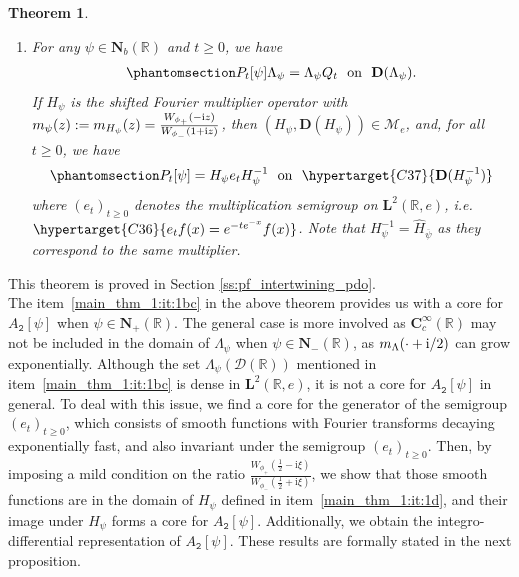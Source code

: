 \documentclass[12pt]{amsart}
\newcommand{\hlabel}{\phantomsection\label}
\newcommand{\hptg}[2]{\hypertarget{#1}{#2}}
\numberwithin{equation}{section}
\newcommand{\bb}{\mathbb}
\renewcommand{\ge}{\geqslant}
\newcommand{\ov}{\overline}
\newcommand{\ttt}{\mathtt}
\newcommand{\bmrm}[2][2]{\mathbf{#2}^{#1}}
\newcommand{\Hpsi}{H_\psi}
\newcommand{\Hpsinv}{H^{-1}_\psi}
\newcommand{\Hpsid}{\widehat{H}_{\ov{\psi}}}
\newcommand{\Wphip}{W_{\phi_+}\left(\frac{1}{2}-\i\xi\right)}
\newcommand{\Wphim}{W_{\phi_-}\left(\frac{1}{2}+\i\xi\right)}
\newcommand{\C}{\mathbf{C}}
\newcommand{\D}{\mathbf{D}}
\renewcommand{\i}{\mathrm{i}}
\newcommand{\LRe}{\bmrm{L}(\bb{R},e)}
\newcommand{\NN}{\mathbf{N}}
\newcommand{\cD}{\mathcal{D}}
\newtheorem{thm}{Theorem}[section]
\theoremstyle{definition}
\theoremstyle{assump}
\theoremstyle{remark}
\begin{document}
{\begin{thm}
\begin{enumerate}[(1)]
\item \hlabel{main_thm_1:it:1d} For any $\psi\in\NN_b(\bb R)$ and  $t\ge 0$, we have
\begin{align}\hlabel{eq:bdd_intertwining}
P_t[\psi]\Lambda_\psi=\Lambda_\psi Q_t \ \mbox{ on } \ \D(\Lambda_\psi).
\end{align}
If $\Hpsi$ is the shifted Fourier multiplier operator with $m_{\psi}(z):=m_{\Hpsi}(z)=\frac{W_{\phi_+}(-{\rm{i}}z)}{W_{\phi_-}(1+{\rm{i}}z)}$, then $(\Hpsi,\D(\Hpsi))\in\mathscr{M}_e$, and, for all $t\ge 0$, we have
\begin{align}\hlabel{eq:spect_decomp}
	P_t[\psi] =\Hpsi e_t\Hpsinv \ \mbox{ on  } \ \hptg{C37}{\D(\Hpsinv)}
\end{align}
where  $(e_t)_{t\ge 0}$ denotes the multiplication semigroup on $\bmrm{L}(\bb{R},e)$, i.e.~ $\hptg{C36}{e_t f(x)=e^{-te^{-x}}f(x)}$. Note that $\Hpsinv=\Hpsid$ as they correspond to the same multiplier.
\end{enumerate}
\end{thm}
This theorem is proved in Section \ref{ss:pf_intertwining_pdo}. \\

\noindent
The item~\eqref{main_thm_1:it:1bc} in the above theorem provides us with a core for $A_\ttt{2}[\psi]$ when $\psi\in\NN_+(\bb R)$. The general case is more involved as $\C^\infty_c(\bb R)$ may not be included in the domain of $\Lambda_\psi$ when $\psi\in\NN_-(\bb R)$, as $m_{\Lambda}(\cdot+{\rm{i}}/2)$ can grow exponentially. Although the set $\Lambda_\psi(\cD(\bb R))$ mentioned in item~\eqref{main_thm_1:it:1bc} is dense in $\LRe$, it is not a core for $A_\ttt{2}[\psi]$ in general. To deal with this issue, we find a core for the generator of the semigroup $(e_t)_{t\ge 0}$, which consists of smooth functions with Fourier transforms decaying exponentially fast, and also invariant under the semigroup $(e_t)_{t\ge 0}$. Then, by imposing a mild condition on the ratio $\frac{\Wphip}{\Wphim}$, we show that those smooth functions are in the domain of $\Hpsi$ defined in item~\eqref{main_thm_1:it:1d}, and their image under $\Hpsi$ forms a core for $A_\ttt{2}[\psi]$. Additionally, we obtain the integro-differential representation of $A_\ttt{2}[\psi]$. These results are formally stated in the next proposition.

}
\end{document}
